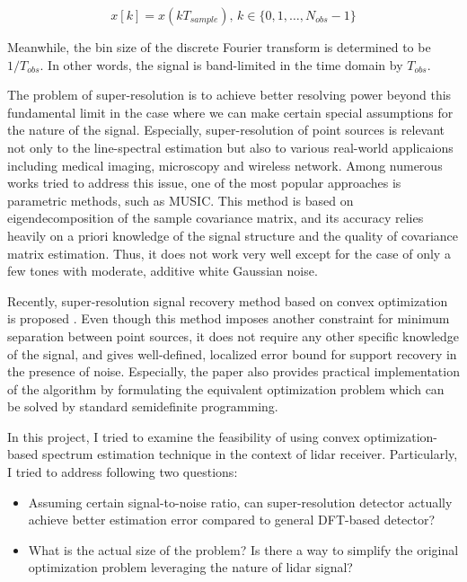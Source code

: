 \documentclass[11pt,journal, onecolumn]{IEEEtran}
\theoremstyle{theorem}
\begin{document}
\begin{equation}
    x[k] = x(kT_{sample}),\,k\in\{0, 1, \ldots, N_{obs}-1\}
\end{equation}

\noindent Meanwhile, the bin size of the discrete Fourier transform is determined to be $1/T_{obs}$. In other words, the signal is band-limited in the time domain by $T_{obs}$.

The problem of super-resolution is to achieve better resolving power beyond this fundamental limit in the case where we can make certain special assumptions for the nature of the signal. Especially, super-resolution of point sources is relevant not only to the line-spectral estimation but also to various real-world applicaions including medical imaging\cite{medical}, microscopy\cite{microscopy} and wireless network\cite{aplocal}. Among numerous works tried to address this issue, one of the most popular approaches is parametric methods, such as MUSIC\cite{music}. This method is based on eigendecomposition of the sample covariance matrix, and its accuracy relies heavily on a priori knowledge of the signal structure and the quality of covariance matrix estimation. Thus, it does not work very well except for the case of only a few tones with moderate, additive white Gaussian noise. 

Recently, super-resolution signal recovery method based on convex optimization is proposed \cite{superres}. Even though this method imposes another constraint for minimum separation between point sources, it does not require any other specific knowledge of the signal, and gives well-defined, localized error bound for support recovery in the presence of noise. Especially, the paper also provides practical implementation of the algorithm by formulating the equivalent optimization problem which can be solved by standard semidefinite programming.

In this project, I tried to examine the feasibility of using convex optimization-based spectrum estimation technique in the context of lidar receiver. Particularly, I tried to address following two questions:
\begin{itemize}
    \item Assuming certain signal-to-noise ratio, can super-resolution detector actually achieve better estimation error compared to general DFT-based detector? 
    \item What is the actual size of the problem? Is there a way to simplify the original optimization problem leveraging the nature of lidar signal? 
\end{itemize}
\end{document}
